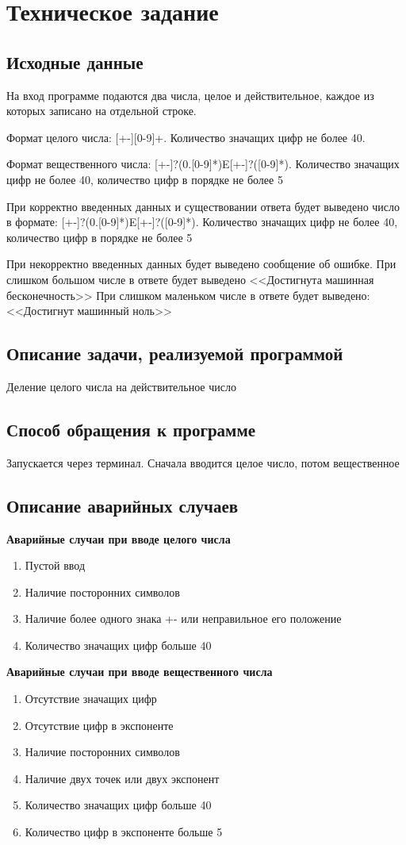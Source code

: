 \chapter{Техническое задание}
\section{Исходные данные}
	На вход программе подаются два числа, целое и действительное, каждое из которых записано на отдельной строке.\par 
	Формат целого числа: [+-][0-9]+. Количество значащих цифр не более 40. \par
	Формат вещественного числа: [+-]?(0.[0-9]*)E[+-]?([0-9]*). Количество значащих цифр не более 40, количество цифр в порядке не более 5\par
	При корректно введенных данных и существовании ответа будет выведено число в формате: [+-]?(0.[0-9]*)E[+-]?([0-9]*). Количество значащих цифр не более 40, количество цифр в порядке не более 5\par
	При некорректно введенных данных будет выведено сообщение об ошибке. При слишком большом числе в ответе будет выведено <<Достигнута машинная бесконечность>> При слишком маленьком числе в ответе будет выведено: <<Достигнут машинный ноль>>


\section{Описание задачи, реализуемой программой}
	Деление целого числа на действительное число

\section{Способ обращения к программе}
	Запускается через терминал. Сначала вводится целое число, потом вещественное

\section{Описание аварийных случаев}
	\textbf{Аварийные случаи при вводе целого числа}
	\begin{enumerate}
		\item Пустой ввод
		\item Наличие посторонних символов
		\item Наличие более одного знака +- или неправильное его положение
		\item Количество значащих цифр больше 40
	\end{enumerate}
	\newpage
	\textbf{Аварийные случаи при вводе вещественного числа}
	\begin{enumerate}
		\item Отсутствие значащих цифр
		\item Отсутствие цифр в экспоненте
		\item Наличие посторонних символов 
		\item Наличие двух точек или двух экспонент
		\item Количество значащих цифр больше 40
		\item Количество цифр в экспоненте больше 5
	\end{enumerate}


